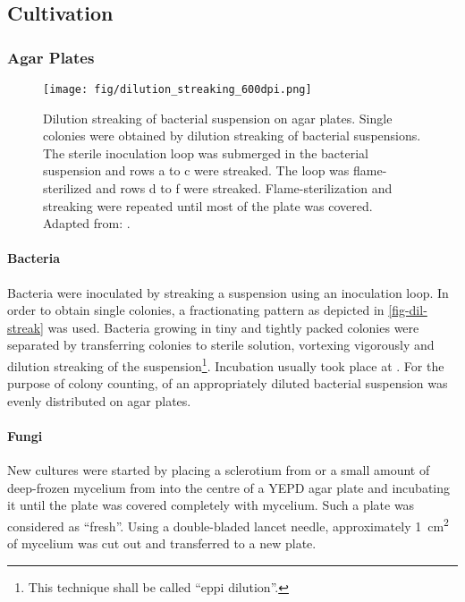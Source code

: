 \subsection{Cultivation}
\subsubsection{Agar Plates}
\begin{figure}
	\begin{center}
		\texttt{[image: fig/dilution\_streaking\_600dpi.png]}
		\caption[Dilution Streaking of Bacterial Suspension on Agar Plates]{Dilution streaking of bacterial suspension on agar plates. Single colonies were obtained by dilution streaking of bacterial suspensions. The sterile inoculation loop was submerged in the bacterial suspension and rows a to c were streaked. The loop was flame-sterilized and rows d to f were streaked. Flame-sterilization and streaking were repeated until most of the plate was covered. Adapted from: \cite{Mack2007}.\label{fig-dil-streak}}
	\end{center}
\end{figure}

\paragraph{Bacteria}
Bacteria were inoculated by streaking a suspension using an inoculation loop. In order to obtain single colonies, a fractionating pattern as depicted in \vref{fig-dil-streak} was used. Bacteria growing in tiny and tightly packed colonies were separated by transferring colonies to  sterile   solution, vortexing vigorously and dilution streaking of the suspension\footnote{This technique shall be called \enquote{eppi dilution}.}. Incubation usually took place at . For the purpose of colony counting,  of an appropriately diluted bacterial suspension was evenly distributed on agar plates.

\paragraph{Fungi}
New cultures were started by placing a sclerotium from \longrolf{} or a small amount of deep-frozen mycelium from \longcomm{} into the centre of a YEPD agar plate and incubating it until the plate was covered completely with mycelium. Such a plate was considered as \enquote{fresh}. Using a double-bladed lancet needle, approximately \SI{1}{\centi\metre\tothe{2}} of mycelium was cut out and transferred to a new plate.

